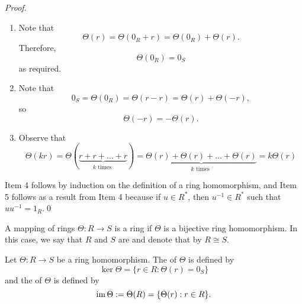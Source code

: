 \begin{proof}
  \begin{enumerate}
    \item Note that
      \begin{equation*}
        \Theta(r) = \Theta(0_R + r) = \Theta(0_R) + \Theta(r).
      \end{equation*}
      Therefore,
      \begin{equation*}
        \Theta(0_R) = 0_S
      \end{equation*}
      as required.
    \item Note that
      \begin{equation*}
        0_S = \Theta(0_R) = \Theta(r - r) = \Theta(r) + \Theta(-r),
      \end{equation*}
      so
      \begin{equation*}
        \Theta(-r) = -\Theta(r).
      \end{equation*}
    \item Observe that
      \begin{equation*}
        \Theta(kr) = \Theta(\underbrace{r + r + \hdots + r}_{k \text{ times }}) = \underbrace{\Theta(r) + \Theta(r) + \hdots + \Theta(r)}_{k \text{ times }} = k \Theta(r)
      \end{equation*}
  \end{enumerate}
  Item 4 follows by induction on the definition of a ring homomorphism, and Item 5 follows as a result from Item 4 because if $u \in R^*$, then $u^{-1} \in R^*$ such that $uu^{-1} = 1_R$.\qed
\end{proof}

\begin{defn}
\label{defn:ring_isomorphism}
  A mapping of rings $\Theta: R \to S$ is a ring  if $\Theta$ is a bijective ring homomorphism. In this case, we say that $R$ and $S$ are  and denote that by $R \cong S$.
\end{defn}

\begin{defn}
\label{defn:kernel_and_image}
  Let $\Theta: R \to S$ be a ring homomorphism. The  of $\Theta$ is defined by
  \begin{equation*}
    \ker \Theta = \{r \in R : \Theta(r) = 0_S\}
  \end{equation*}
  and the  of $\Theta$ is defined by
  \begin{equation*}
    \operatorname{im} \Theta := \Theta(R) = \{\Theta(r) : r \in R\}.
  \end{equation*}
\end{defn}

